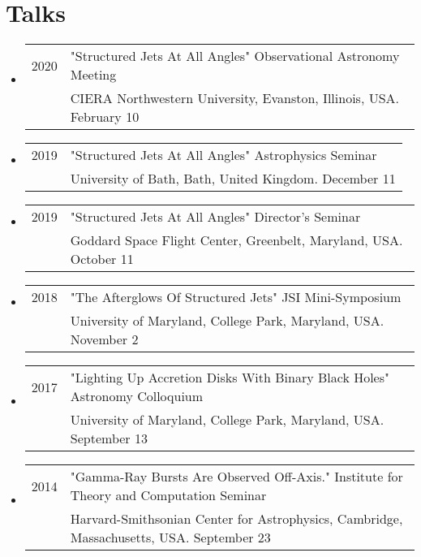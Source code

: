 \section*{Talks}
\begin{itemize}
\item \begin{tabular}{ll}
2020 & "Structured Jets At All Angles" Observational Astronomy Meeting  \\
	& CIERA Northwestern University, Evanston, Illinois, USA.  February 10
\end{tabular}
\item \begin{tabular}{ll}
2019 & "Structured Jets At All Angles" Astrophysics Seminar  \\
	& University of Bath, Bath, United Kingdom.  December 11
\end{tabular}
\item \begin{tabular}{ll}
2019 & "Structured Jets At All Angles" Director's Seminar  \\
	& Goddard Space Flight Center, Greenbelt, Maryland, USA.  October 11
\end{tabular}

\item \begin{tabular}{ll}
2018 & "The Afterglows Of Structured Jets" JSI Mini-Symposium  \\
	& University of Maryland, College Park, Maryland, USA.  November 2
\end{tabular}

\item \begin{tabular}{ll}
2017 & "Lighting Up Accretion Disks With Binary Black Holes" Astronomy Colloquium  \\
	& University of Maryland, College Park, Maryland, USA.  September 13
\end{tabular}

\item \begin{tabular}{ll}
2014 & "Gamma-Ray Bursts Are Observed Off-Axis." Institute for Theory and Computation Seminar  \\
	& Harvard-Smithsonian Center for Astrophysics, Cambridge, Massachusetts, USA.  September 23
\end{tabular}
\end{itemize}

